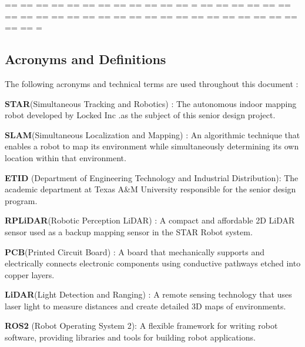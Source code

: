     == == == == == == == == == == == ==
    = %
      == == == == == == == == == == == == == == == == == == == == == == == == ==
      == ==
    =

\subsection {
  Acronyms and Definitions
}
\label{sec : acronyms}

The following acronyms and technical terms are used throughout this document :

\begin {
  enumerate
}
\item \label {
acr:
  STAR
}
\textbf{STAR}(Simultaneous Tracking and Robotics)
    : The autonomous indoor mapping robot developed by Locked Inc
          .as the subject of this senior design project.

    \item \label {
acr:
  SLAM
}
\textbf{SLAM}(Simultaneous Localization and Mapping)
    : An algorithmic technique that enables a robot to map its environment
      while simultaneously determining its own location within that environment.

    \item \label {
acr:
  ETID
} \textbf{ETID} (Department of Engineering Technology and Industrial Distribution): The academic department at Texas A\&M University responsible for the senior design program.

    \item \label{
acr:
  RPLiDAR
}
\textbf{RPLiDAR}(Robotic Perception LiDAR)
    : A compact and
      affordable
      2D LiDAR sensor used as a backup mapping sensor in the STAR Robot system.

    \item \label {
acr:
  PCB
}
\textbf{PCB}(Printed Circuit Board)
    : A board that mechanically supports
      and electrically connects electronic components
          using conductive pathways etched into copper layers.

    \item \label {
acr:
  LiDAR
}
\textbf{LiDAR}(Light Detection and Ranging)
    : A remote sensing technology that uses laser light to measure distances
      and create detailed 3D maps of environments.

    \item \label {
acr:
  ROS2
} \textbf{ROS2} (Robot Operating System 2): A flexible framework for writing robot software, providing libraries and tools for building robot applications.


\end{
  enumerate
}
